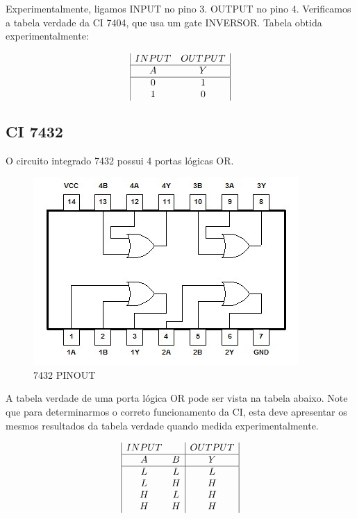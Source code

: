 \documentclass{article}
\begin{document}
Experimentalmente, ligamos INPUT no pino 3. OUTPUT no pino 4. Verificamos a tabela verdade da CI 7404, que usa um gate INVERSOR. Tabela obtida experimentalmente:

\begin{displaymath}
\begin{array}{|c c|c|}
INPUT & OUTPUT\\
\hline
A & Y\\
\hline %
0 & 1\\
1 & 0\\
\end{array}
\end{displaymath}

\subsection{CI 7432}
O circuito integrado 7432 possui 4 portas lógicas OR.

\begin{figure}[h!]
  \includegraphics[scale=.7]{7432}
  \caption{7432 PINOUT}
  \label{fig:E}
\end{figure}

A tabela verdade de uma porta lógica OR pode ser vista na tabela abaixo. Note que para determinarmos o correto funcionamento da CI, esta deve apresentar os mesmos resultados da tabela verdade quando medida experimentalmente.

\begin{displaymath}
\begin{array}{|c c|c|}
INPUT & & OUTPUT\\
\hline
A & B & Y\\
\hline %
L & L & L\\
L & H & H\\
H & L & H\\
H & H & H\\
\end{array}
\end{displaymath}
\end{document}
